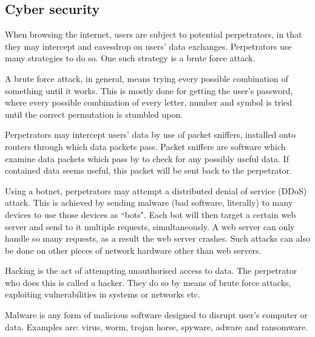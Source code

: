 \subsection{Cyber security}

When browsing the internet, users are subject to potential perpetrators, in that they may intercept
and eavesdrop on users' data exchanges. Perpetrators use many strategies to do so. One such 
strategy is a brute force attack.

A brute force attack, in general, means trying every possible combination of something until it
works. This is mostly done for getting the user's password, where every possible combination of
every letter, number and symbol is tried until the correct permutation is stumbled upon.

Perpetrators may intercept users' data by use of packet sniffers, installed onto routers through
which data packets pass. Packet sniffers are software which examine data packets which pass by
to check for any possibly useful data. If contained data seems useful, this packet will be sent
back to the perpetrator.

Using a botnet, perpetrators may attempt a distributed denial of service (DDoS) attack. This is
achieved by sending malware (bad software, literally) to many devices to use those devices as
``bots". Each bot will then target a certain web server and send to it multiple requests, 
simultaneously. A web server can only handle so many requests, as a result the web server crashes.
Such attacks can also be done on other pieces of network hardware other than web servers.

Hacking is the act of attempting unauthorised access to data. The perpetrator who does this is 
called a hacker. They do so by means of brute force attacks, exploiting vulnerabilities in systems
or networks etc.

Malware is any form of malicious software designed to disrupt user's computer or data. Examples
are: virus, worm, trojan horse, spyware, adware and ransomware.

